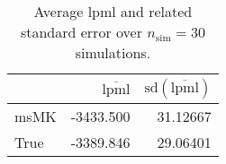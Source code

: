 \begin{table}[H]

\caption{Average lpml and related standard error over $n_{\text{sim}} = 30$ simulations.}
\centering
\begin{tabular}[t]{lrr}
\toprule
  & $\overbar{\text{lpml}}$ & $\text{sd}(\overbar{\text{lpml}})$\\
\midrule
msMK & -3433.500 & 31.12667\\
True & -3389.846 & 29.06401\\
\bottomrule
\end{tabular}
\end{table}